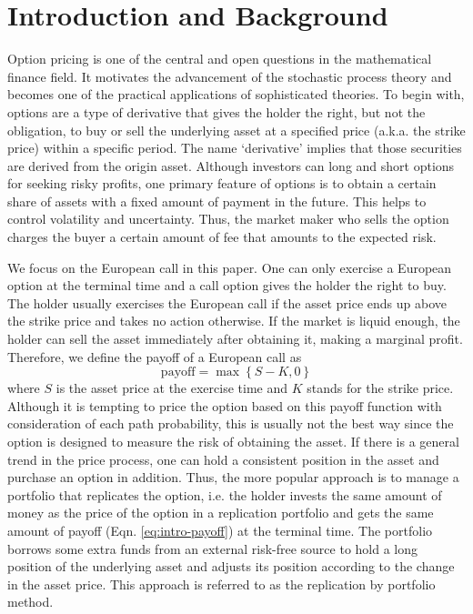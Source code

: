 \section{Introduction and Background}

Option pricing is one of the central and open questions in the mathematical
finance field. It motivates the advancement of the stochastic process
theory and becomes one of the practical applications of sophisticated
theories. To begin with, options are a type of derivative that gives
the holder the right, but not the obligation, to buy or sell the underlying
asset at a specified price (a.k.a. the strike price) within a specific
period. The name `derivative' implies that those securities are derived
from the origin asset. Although investors can long and short options
for seeking risky profits, one primary feature of options is to obtain
a certain share of assets with a fixed amount of payment in the future.
This helps to control volatility and uncertainty. Thus, the market
maker who sells the option charges the buyer a certain amount of fee
that amounts to the expected risk.

We focus on the European call in this paper. One can only exercise
a European option at the terminal time and a call option gives the
holder the right to buy. The holder usually exercises the European
call if the asset price ends up above the strike price and takes no
action otherwise. If the market is liquid enough, the holder can sell
the asset immediately after obtaining it, making a marginal profit.
Therefore, we define the payoff of a European call as
\begin{equation}
\text{payoff}=\max\left\{ S-K,0\right\} \label{eq:intro-payoff}
\end{equation}
where $S$ is the asset price at the exercise time and $K$ stands
for the strike price. Although it is tempting to price the option
based on this payoff function with consideration of each path probability,
this is usually not the best way since the option is designed to measure
the risk of obtaining the asset. If there is a general trend in the
price process, one can hold a consistent position in the asset and
purchase an option in addition. Thus, the more popular approach is
to manage a portfolio that replicates the option, i.e. the holder
invests the same amount of money as the price of the option in a replication
portfolio and gets the same amount of payoff (Eqn. \ref{eq:intro-payoff})
at the terminal time. The portfolio borrows some extra funds from
an external risk-free source to hold a long position of the underlying
asset and adjusts its position according to the change in the asset
price. This approach is referred to as the replication by portfolio
method.

